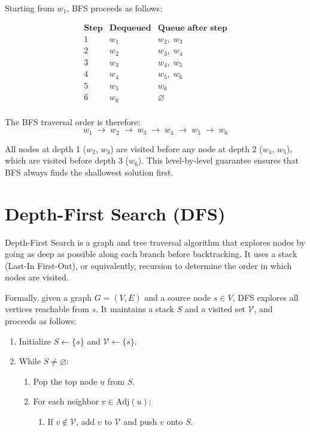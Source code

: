 \documentclass[12pt,a4paper,openany]{article}
\begin{document}
Starting from $w_1$, BFS proceeds as follows:

\[
\begin{array}{c|c|c}
\textbf{Step} & \textbf{Dequeued} & \textbf{Queue after step} \\
\hline
1 & w_1 & w_2,\; w_3 \\
2 & w_2 & w_3,\; w_4 \\
3 & w_3 & w_4,\; w_5 \\
4 & w_4 & w_5,\; w_6 \\
5 & w_5 & w_6 \\
6 & w_6 & \varnothing \\
\end{array}
\]

The BFS traversal order is therefore:
\[
w_1 \;\to\; w_2 \;\to\; w_3 \;\to\; w_4 \;\to\; w_5 \;\to\; w_6
\]

All nodes at depth 1 ($w_2$, $w_3$) are visited before any node at depth 2
($w_4$, $w_5$), which are visited before depth 3 ($w_6$). This level-by-level
guarantee ensures that BFS always finds the shallowest solution first.

\section{Depth-First Search (DFS)}

Depth-First Search is a graph and tree traversal algorithm that explores
nodes by going as deep as possible along each branch before backtracking.
It uses a stack (Last-In First-Out), or equivalently, recursion to
determine the order in which nodes are visited.

Formally, given a graph $G = (V, E)$ and a source node $s \in V$, DFS
explores all vertices reachable from $s$. It maintains a stack $S$ and
a visited set $\mathcal{V}$, and proceeds as follows:

\begin{enumerate}
  \item Initialize $S \leftarrow \{s\}$ and $\mathcal{V} \leftarrow \{s\}$.
  \item While $S \neq \varnothing$:
  \begin{enumerate}
    \item Pop the top node $u$ from $S$.
    \item For each neighbor $v \in \text{Adj}(u)$:
    \begin{enumerate}
      \item If $v \notin \mathcal{V}$, add $v$ to $\mathcal{V}$ and push $v$ onto $S$.
    \end{enumerate}
  \end{enumerate}
\end{enumerate}
\end{document}
